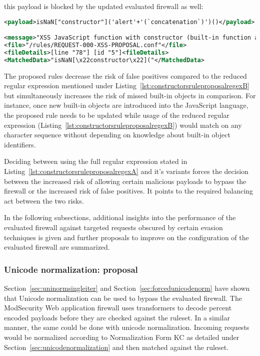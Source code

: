 this payload is blocked by the updated evaluated firewall as well:

\begin{lstlisting}[style=ruleStyle, language=XML, caption=function constructor bypass payload using an alternative built-in function blocked, label={lst:constructorsblockedbif}]
<payload>isNaN["constructor"]('alert'+'(`concatenation`)')()</payload>

<message>"XSS JavaScript function with constructor (built-in function access)"</message>
<file>"/rules/REQUEST-000-XSS-PROPOSAL.conf"</file>
<fileDetails>[line "78"] [id "5"]<fileDetails>
<MatchedData>"isNaN[\x22constructor\x22]("</MatchedData>
\end{lstlisting}

The proposed rules decrease the risk of false positives compared to the reduced regular expression mentioned under Listing~\ref{lst:constructorsruleproposalregexB} but simultaneously increases the risk of missed built-in objects in comparison. For instance, once new built-in objects are introduced into the JavaScript language, the proposed rule needs to be updated while usage of the reduced regular expression (Listing~\ref{lst:constructorsruleproposalregexB}) would match on any character sequence without depending on knowledge about built-in object identifiers.

Deciding between using the full regular expression stated in Listing~\ref{lst:constructorsruleproposalregexA} and it's variants forces the decision between the increased risk of allowing certain malicious payloads to bypass the firewall or the increased risk of false positives. It points to the required balancing act between the two risks.

\bigskip
In the following subsections, additional insights into the performance of the evaluated firewall against targeted requests obscured by certain evasion techniques is given and further proposals to improve on the configuration of the evaluated firewall are summarized.


\subsubsection{Unicode normalization: proposal}
\label{sec:unicodenormprop}
Section~\ref{sec:uninormsingleiter} and Section~\ref{sec:forcedunicodenorm} have shown that Unicode normalization can be used to bypass the evaluated firewall.
The ModSecurity Web application firewall uses transformers to decode percent encoded payloads before they are checked against the ruleset. In a similar manner, the same could be done with unicode normalization. Incoming requests would be normalized according to Normalization Form KC as detailed under Section~\ref{sec:unicodenormalization} and then matched against the ruleset.

